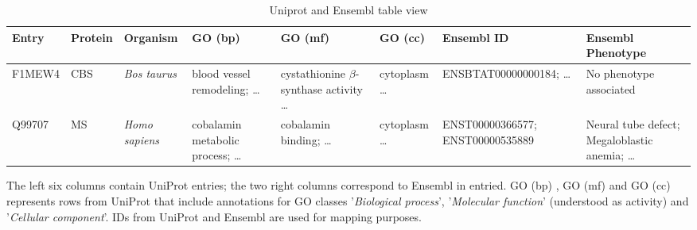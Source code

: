 \begin{table*}[t]
	\begin{threeparttable}
		\caption{Uniprot and Ensembl table view}
		\label{table:uniprot}
		\centering
		\begin{tabular}{p{0.45in}p{0.4in}p{0.5in}p{0.8in}p{0.8in}p{0.6in}|p{1.25in}p{1.2in}} 
			\hline 
			Entry & Protein & Organism & GO (bp) & GO (mf) & GO (cc) & Ensembl ID & Ensembl Phenotype\\ \hline 
			F1MEW4 & CBS & \textit{Bos taurus} & blood vessel remodeling; \ldots & cystathionine $\beta$-synthase activity \ldots & cytoplasm \ldots & ENSBTAT00000000184; \ldots & No phenotype associated \\ 
			Q99707 & MS & \textit{Homo sapiens} & cobalamin metabolic process; \ldots & cobalamin binding; \ldots & cytoplasm \ldots & ENST00000366577; ENST00000535889 & Neural tube defect; Megaloblastic anemia; \ldots \\ \hline 
		\end{tabular}
		\begin{tablenotes}
			\item The left six columns contain UniProt entries; the two right columns correspond to Ensembl in entried. GO (bp) , GO (mf) and GO (cc) represents rows from UniProt that include annotations for GO classes '\textit{Biological process}', '\textit{Molecular function}' (understood as activity) and '\textit{Cellular component}'. IDs from UniProt and Ensembl are used for mapping purposes.\\ 
		\end{tablenotes}
	\end{threeparttable}
\end{table*}
 
